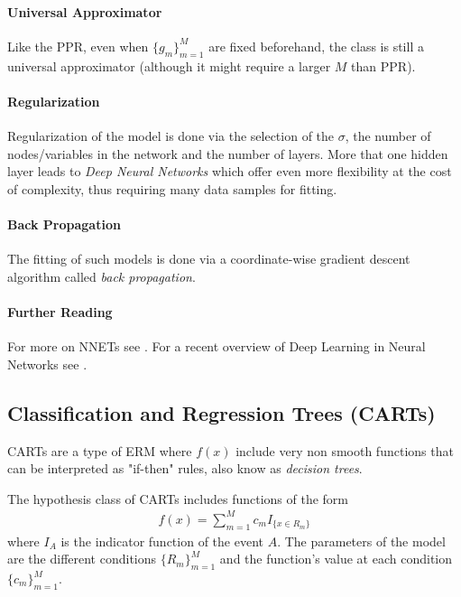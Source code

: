 \documentclass[12pt,a4paper]{article}
\theoremstyle{plain}
\theoremstyle{definition}
\newcommand{\hyp}{f}
\newcommand{\indicator}[1]{I_{\{ #1 \}}}
\begin{document}
\paragraph{Universal Approximator}
Like the PPR, even when $\{g_m\}_{m=1}^M$ are fixed beforehand, the class is still a universal approximator (although it might require a larger $M$ than PPR).

\paragraph{Regularization}
Regularization of the model is done via the selection of the $\sigma$, the number of nodes/variables in the network and the number of layers. More that one hidden layer leads to \emph{Deep Neural Networks} which offer even more flexibility at the cost of complexity, thus requiring many data samples for fitting.

\paragraph{Back Propagation}
The fitting of such models is done via a coordinate-wise gradient descent algorithm called \emph{back propagation}.

\paragraph{Further Reading}
For more on NNETs see \citep[Chapter 11]{hastie_elements_2003}.
For a recent overview of Deep Learning in Neural Networks see \cite{schmidhuber_deep_2015}.




\subsection{Classification and Regression Trees (CARTs)}
CARTs are a type of ERM where $\hyp(x)$ include very non smooth functions that can be interpreted as "if-then" rules, also know as \emph{decision trees}.

The hypothesis class of CARTs includes functions of the form
\begin{align}
\label{eq:decision_list}
	\hyp(x)=\sum_{m=1}^M c_m \indicator{x \in R_m}
\end{align}
where $I_A$ is the indicator function of the event $A$.
The parameters of the model are the different conditions $\{R_m\}_{m=1}^M$ and the function's value at each condition $\{c_m\}_{m=1}^M$. 
\end{document}
